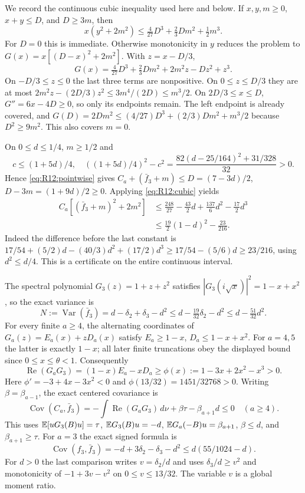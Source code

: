 We record the continuous cubic inequality used here and below. If
$x,y,m\ge0$, $x+y\le D$, and $D\ge3m$, then
\begin{equation}\tag{R12.4.1}\label{eq:R12:cubic}
x(y^2+2m^2)\le\tfrac4{27}D^3+\tfrac23Dm^2+\tfrac12m^3.
\end{equation}
For $D=0$ this is immediate. Otherwise monotonicity in $y$ reduces
the problem to $G(x)=x[(D-x)^2+2m^2]$. With $z=x-D/3$,
\[
G(x)=\tfrac4{27}D^3+\tfrac23Dm^2+2m^2z-Dz^2+z^3.
\]
On $-D/3\le z\le0$ the last three terms are nonpositive. On
$0\le z\le D/3$ they are at most
$2m^2z-(2D/3)z^2\le3m^4/(2D)\le m^3/2$.
On $2D/3\le x\le D$, $G''=6x-4D\ge0$, so only its endpoints
remain. The left endpoint is already covered, and
$G(D)=2Dm^2\le(4/27)D^3+(2/3)Dm^2+m^3/2$ because $D^2\ge9m^2$.
This also covers $m=0$.

On $0\le d\le1/4$, $m\ge1/2$ and
\[
c\le(1+5d)/4,
\quad ((1+5d)/4)^2-c^2
=\frac{82(d-25/164)^2+31/328}{32}>0.
\]
Hence \eqref{eq:R12:pointwise} gives
$C_a+(\bar f_3+m)\le D=(7-3d)/2$,
$D-3m=(1+9d)/2\ge0$. Applying \eqref{eq:R12:cubic} yields
\begin{align*}
C_a[(\bar f_3+m)^2+2m^2]
&\le\tfrac{248}{27}-\tfrac{43}{2}d+\tfrac{137}{6}d^2-\tfrac{17}{2}d^3\\
&\le\tfrac{19}{2}(1-d)^2-\tfrac{23}{216}.
\end{align*}
Indeed the difference before the last constant is
$17/54+(5/2)d-(40/3)d^2+(17/2)d^3
\ge17/54-(5/6)d\ge23/216$, using $d^2\le d/4$.
This is a certificate on the entire continuous interval.

The spectral polynomial $G_3(z)=1+z+z^2$ satisfies
$|G_3(i\sqrt x)|^2=1-x+x^2$, so the exact variance is
\begin{equation}\tag{R12.6.1}\label{eq:R12:variance}
N:=\operatorname{Var}(\bar f_3)=d-\delta_2+\delta_3-d^2
\le d-\tfrac{19}{32}\delta_2-d^2\le d-\tfrac{51}{32}d^2.
\end{equation}
For every finite $a\ge4$, the alternating coordinates of
$G_a(z)=E_a(x)+zD_a(x)$ satisfy
$E_a\ge1-x$, $D_a\le1-x+x^2$.
For $a=4,5$ the latter is exactly $1-x$; all later finite truncations
obey the displayed bound since $0\le x\le\theta<1$.
Consequently
\[
\operatorname{Re}(G_aG_3)=(1-x)E_a-xD_a
\ge\phi(x):=1-3x+2x^2-x^3>0.
\]
Here $\phi'=-3+4x-3x^2<0$ and
$\phi(13/32)=1451/32768>0$.
Writing $\beta=\beta_{a-1}$, the exact centered covariance is
\begin{equation}\tag{R12.6.5}\label{eq:R12:covariance}
\operatorname{Cov}(C_a,\bar f_3)
=-\int\operatorname{Re}(G_aG_3)\,d\nu
+\beta\tau-\beta_{a+1}d\le0\quad(a\ge4).
\end{equation}
This uses $\mathbb E[uG_3(B)u]=\tau$, $\mathbb E G_3(B)u=-d$,
$\mathbb E G_a(-B)u=\beta_{a+1}$, $\beta\le d$, and
$\beta_{a+1}\ge\tau$.
For $a=3$ the exact signed formula is
\begin{equation}\tag{R12.6.6}\label{eq:R12:a3covariance}
\operatorname{Cov}(f_3,\bar f_3)
=-d+3\delta_2-\delta_3-d^2
\le d(55/1024-d).
\end{equation}
For $d>0$ the last comparison writes $v=\delta_2/d$ and uses
$\delta_3/d\ge v^2$ and monotonicity of $-1+3v-v^2$ on
$0\le v\le13/32$. The variable $v$ is a global moment ratio.

